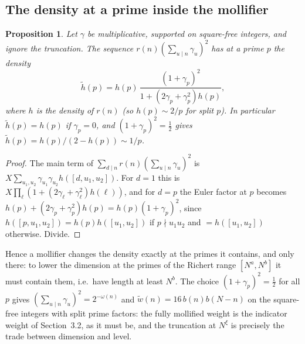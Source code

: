 \documentclass[11pt,a4paper]{article}
\newtheorem{proposition}[theorem]{Proposition}
\theoremstyle{remark}
\theoremstyle{definition}
\begin{document}
\subsection{The density at a prime inside the mollifier}
\begin{proposition}\label{prop:density}
Let $\gamma$ be multiplicative, supported on square-free integers, and ignore the truncation. The sequence $r(n)(\sum_{u\mid n}\gamma_u)^2$ has at a prime $p$ the density
\[
\tilde h(p)=h(p)\,\frac{(1+\gamma_p)^2}{1+(2\gamma_p+\gamma_p^2)h(p)},
\]
where $h$ is the density of $r(n)$ (so $h(p)\sim2/p$ for split $p$). In particular $\tilde h(p)=h(p)$ if $\gamma_p=0$, and $(1+\gamma_p)^2=\frac12$ gives $\tilde h(p)=h(p)/(2-h(p))\sim1/p$.
\end{proposition}
\begin{proof}
The main term of $\sum_{d\mid n}r(n)(\sum_{u\mid n}\gamma_u)^2$ is $X\sum_{u_1,u_2}\gamma_{u_1}\gamma_{u_2}h([d,u_1,u_2])$. For $d=1$ this is $X\prod_\ell(1+(2\gamma_\ell+\gamma_\ell^2)h(\ell))$, and for $d=p$ the Euler factor at $p$ becomes $h(p)+(2\gamma_p+\gamma_p^2)h(p)=h(p)(1+\gamma_p)^2$, since $h([p,u_1,u_2])=h(p)h([u_1,u_2])$ if $p\nmid u_1u_2$ and $=h([u_1,u_2])$ otherwise. Divide.
\end{proof}

Hence a mollifier changes the density exactly at the primes it contains, and only there: to lower the dimension at the primes of the Richert range $[N^a,N^b]$ it must contain them, i.e.\ have length at least $N^b$. The choice $(1+\gamma_p)^2=\frac12$ for all $p$ gives $(\sum_{u\mid n}\gamma_u)^2=2^{-\omega(n)}$ and $\tilde w(n)=16\,b(n)b(N-n)$ on the square-free integers with split prime factors: the fully mollified weight is the indicator weight of Section~3.2, as it must be, and the truncation at $N^\xi$ is precisely the trade between dimension and level.
\end{document}
